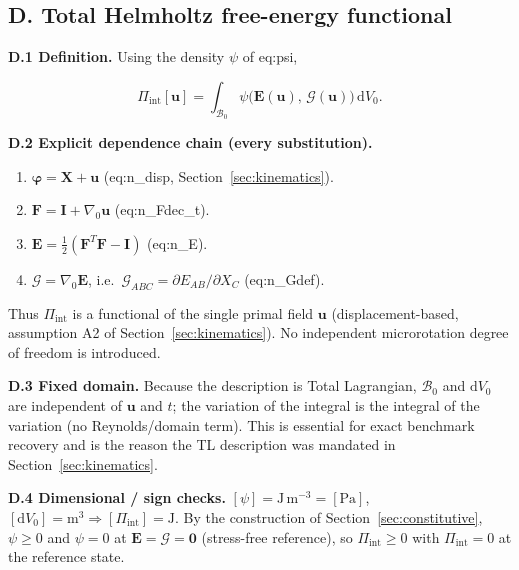 \documentclass[11pt]{article}
\begin{document}
\subsection{D. Total Helmholtz free-energy functional}

\textbf{D.1 Definition.} Using the density $\psi$ of eq:psi,

\begin{equation}
\Pi_{\mathrm{int}}[\mathbf{u}]
= \int_{\mathcal{B}_{0}}
  \psi\bigl(\mathbf{E}(\mathbf{u}),\,
           \bm{\mathcal{G}}(\mathbf{u})\bigr)\,
  \mathrm{d}V_{0}.
\label{rn:Pi}
\end{equation}

\textbf{D.2 Explicit dependence chain (every substitution).}

\begin{enumerate}
\item $\boldsymbol{\varphi}=\mathbf{X}+\mathbf{u}$ (eq:n\_disp, Section~\ref{sec:kinematics}).

\item $\mathbf{F}=\mathbf{I}+\nabla_{0}\mathbf{u}$ (eq:n\_Fdec\_t).

\item $\mathbf{E}=\tfrac12(\mathbf{F}^{T}\mathbf{F}-\mathbf{I})$ (eq:n\_E).

\item $\bm{\mathcal{G}}=\nabla_{0}\mathbf{E}$, i.e.\ $\mathcal{G}_{ABC}=\partial E_{AB}/\partial X_{C}$ (eq:n\_Gdef).
\end{enumerate}

Thus $\Pi_{\mathrm{int}}$ is a functional of the single primal field $\mathbf{u}$ (displacement-based, assumption A2 of Section~\ref{sec:kinematics}). No independent microrotation degree of freedom is introduced.

\textbf{D.3 Fixed domain.} Because the description is Total Lagrangian, $\mathcal{B}_{0}$ and $\mathrm{d}V_{0}$ are independent of $\mathbf{u}$ and $t$; the variation of the integral is the integral of the variation (no Reynolds/domain term). This is essential for exact benchmark recovery and is the reason the TL description was mandated in Section~\ref{sec:kinematics}.

\textbf{D.4 Dimensional / sign checks.} $[\psi]=\mathrm{J\,m^{-3}}=[\mathrm{Pa}]$, $[\mathrm{d}V_{0}]=\mathrm{m^{3}}\Rightarrow[\Pi_{\mathrm{int}}]=\mathrm{J}$. By the construction of Section~\ref{sec:constitutive}, $\psi\ge 0$ and $\psi=0$ at $\mathbf{E}=\bm{\mathcal{G}}=\mathbf{0}$ (stress-free reference), so $\Pi_{\mathrm{int}}\ge 0$ with $\Pi_{\mathrm{int}}=0$ at the reference state. \checkmark
\end{document}
